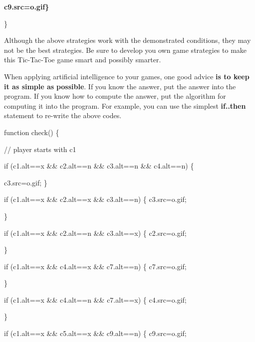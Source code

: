 \documentclass[
]{article}
\begin{document}
\textbf{c9.src=\textquotesingle o.gif\textquotesingle\}}

\}

Although the above strategies work with the demonstrated conditions,
they may not be the best strategies. Be sure to develop you own game
strategies to make this Tic-Tac-Toe game smart and possibly smarter.

When applying artificial intelligence to your games, one good advice
\textbf{is to keep it as simple as} \textbf{possible}. If you know the
answer, put the answer into the program. If you know how to compute the
answer, put the algorithm for computing it into the program. For
example, you can use the simplest \textbf{if..then} statement to
re-write the above codes.

function check() \{

// player starts with c1

if (c1.alt==\textquotesingle x\textquotesingle{} \&\&
c2.alt==\textquotesingle n\textquotesingle{} \&\&
c3.alt==\textquotesingle n\textquotesingle{} \&\&
c4.alt==\textquotesingle n\textquotesingle) \{

c3.src=\textquotesingle o.gif\textquotesingle; \}

if (c1.alt==\textquotesingle x\textquotesingle{} \&\&
c2.alt==\textquotesingle x\textquotesingle{} \&\&
c3.alt==\textquotesingle n\textquotesingle) \{
c3.src=\textquotesingle o.gif\textquotesingle;

\}

if (c1.alt==\textquotesingle x\textquotesingle{} \&\&
c2.alt==\textquotesingle n\textquotesingle{} \&\&
c3.alt==\textquotesingle x\textquotesingle) \{
c2.src=\textquotesingle o.gif\textquotesingle;

\}

if (c1.alt==\textquotesingle x\textquotesingle{} \&\&
c4.alt==\textquotesingle x\textquotesingle{} \&\&
c7.alt==\textquotesingle n\textquotesingle) \{
c7.src=\textquotesingle o.gif\textquotesingle;

\}

if (c1.alt==\textquotesingle x\textquotesingle{} \&\&
c4.alt==\textquotesingle n\textquotesingle{} \&\&
c7.alt==\textquotesingle x\textquotesingle) \{
c4.src=\textquotesingle o.gif\textquotesingle;

\}

if (c1.alt==\textquotesingle x\textquotesingle{} \&\&
c5.alt==\textquotesingle x\textquotesingle{} \&\&
c9.alt==\textquotesingle n\textquotesingle) \{
c9.src=\textquotesingle o.gif\textquotesingle;
\end{document}
